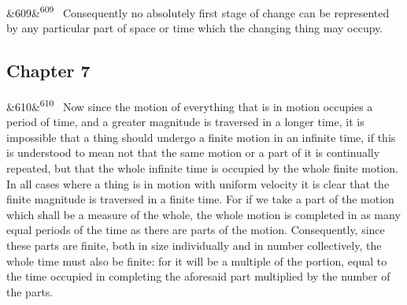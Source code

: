 \documentclass[12pt]{article}
\newcommand{\para}[1][]{\par\noindent\ifx&#1&\else\textsuperscript{\footnotesize #1}~\fi}
\begin{document}
\para[609] Consequently no absolutely first stage of change can be represented by any particular part of space or time which the changing thing may occupy.

\subsection*{Chapter 7}

\para[610] Now since the motion of everything that is in motion occupies a period of time, and a greater magnitude is traversed in a longer time, it is impossible that a thing should undergo a finite motion in an infinite time, if this is understood to mean not that the same motion or a part of it is continually repeated, but that the whole infinite time is occupied by the whole finite motion. In all cases where a thing is in motion with uniform velocity it is clear that the finite magnitude is traversed in a finite time. For if we take a part of the motion which shall be a measure of the whole, the whole motion is completed in as many equal periods of the time as there are parts of the motion. Consequently, since these parts are finite, both in size individually and in number collectively, the whole time must also be finite: for it will be a multiple of the portion, equal to the time occupied in completing the aforesaid part multiplied by the number of the parts.
\end{document}
